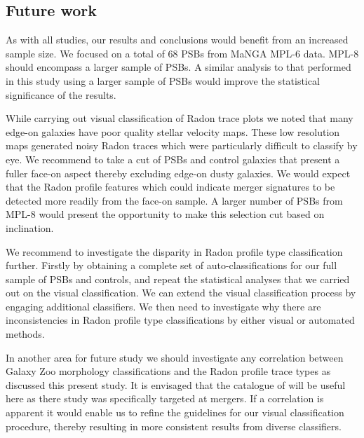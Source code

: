 \subsection{Future work}
\label{sec:future-work}
As with all studies, our results and conclusions would benefit from an increased sample size. We focused on a total of 68 PSBs from MaNGA MPL-6 data. MPL-8 should encompass a larger sample of PSBs. A similar analysis to that performed in this study using a larger sample of PSBs would improve the statistical significance of the results.

While carrying out visual classification of Radon trace plots we noted that many edge-on galaxies have poor quality stellar velocity maps. These low resolution maps generated noisy Radon traces which were particularly difficult to classify by eye. We recommend to take a cut of PSBs and control galaxies that present a fuller face-on aspect thereby excluding edge-on dusty galaxies. We would expect that the Radon profile features which could indicate merger signatures to be detected more readily from the face-on sample. A larger number of PSBs from MPL-8 would present the opportunity to make this selection cut based on inclination.

We recommend to investigate the disparity in Radon profile type classification further. Firstly by obtaining a complete set of auto-classifications for our full sample of PSBs and controls, and repeat the statistical analyses that we carried out on the visual classification. We can extend the visual classification process by engaging additional classifiers. We then need to investigate why there are inconsistencies in Radon profile type classifications by either visual or automated methods. 

In another area for future study we should investigate any correlation between Galaxy Zoo morphology classifications and the Radon profile trace types as discussed this present study. It is envisaged that the catalogue of \citet{2018MNRAS.479..415A} will be useful here as there study was specifically targeted at mergers. If a correlation is apparent it would enable us to refine the guidelines for our visual classification procedure, thereby resulting in more consistent results from diverse classifiers.


